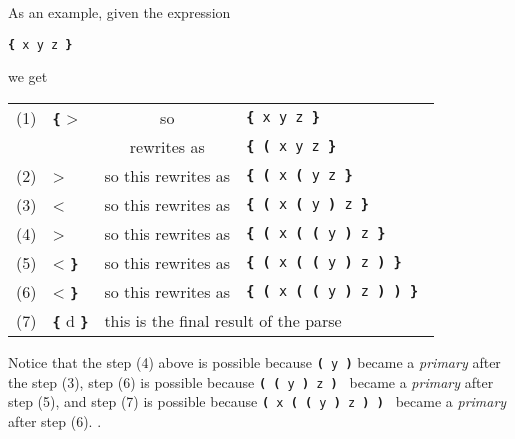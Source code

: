 \documentclass[12pt]{article}
\newcommand{\TT}[1]{{\tt \bfseries #1}}
\begin{document}
As an example, given the expression
\begin{center}
\tt \TT{\{}  x \IX{+} \RX{+} y \IX{*} z \TT{\}}
\end{center}
we get
\begin{center}
\begin{tabular}{llcl}
(1) &
\TT{\{} > \IX{+}
    & so & \tt \TT{\{} x \IX{+} \RX{+} y \IX{*} z \TT{\}} \\
&   & rewrites as
    & \tt \TT{\{} \TT{(} x \IX{+} \RX{+} y \IX{*} z \TT{\}}\\
(2) &
\IX{+} > \RX{+}
    & so this rewrites as
    & \tt \TT{\{} \TT{(} x \IX{+} \TT{(} \RX{+} y \IX{*} z \TT{\}} \\
(3) &
\RX{+} < \IX{*}
    & so this rewrites as
    & \tt \TT{\{} \TT{(} x \IX{+} \TT{(} \RX{+} y \TT{)} \IX{*} z \TT{\}} \\
(4) &
\IX{+} > \IX{*}
    & so this rewrites as
    & \tt \TT{\{} \TT{(} x \IX{+} \TT{(} \TT{(} \RX{+} y \TT{)} \IX{*} z
          \TT{\}} \\
(5) &
\IX{*} < \TT{\}}
    & so this rewrites as
    & \tt \TT{\{} \TT{(} x \IX{+} \TT{(} \TT{(} \RX{+} y \TT{)} \IX{*} z
          \TT{)} \TT{\}} \\
(6) &
\IX{+} < \TT{\}}
    & so this rewrites as
    & \tt \TT{\{} \TT{(} x \IX{+} \TT{(} \TT{(} \RX{+} y \TT{)} \IX{*} z
          \TT{)} \TT{)} \TT{\}} \\
(7) &
\TT{\{} d \TT{\}}
    & \multicolumn{2}{l}{this is the final result of the parse}
\end{tabular}
\end{center}

Notice that the step (4) above is possible because
{\tt \TT{(} \RX{+} y \TT{)}} became a {\em primary} after
the step (3),
step (6) is possible because
{\tt \TT{(} \TT{(} \RX{+} y \TT{)} \IX{*} z \TT{)} }
became a {\em primary} after step (5),
and step (7) is possible because
{ \tt \TT{(} x \IX{+} \TT{(} \TT{(} \RX{+} y \TT{)} \IX{*} z \TT{)} \TT{)} }
became a {\em primary} after step (6).
.
\end{document}
